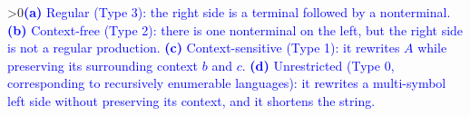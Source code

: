 \documentclass[12pt]{article}
\newcounter{showsolution}
\newcommand{\solution}[2]{\ifnum\value{showsolution}>0{\textcolor{blue}{#1}}\else{#2}\fi}
\begin{document}

\solution{\textbf{(a)} Regular (Type 3): the right side is a terminal followed by a nonterminal.
\textbf{(b)} Context-free (Type 2): there is one nonterminal on the left, but the right side is not a regular production.
\textbf{(c)} Context-sensitive (Type 1): it rewrites $A$ while preserving its surrounding context $b$ and $c$.
\textbf{(d)} Unrestricted (Type 0, corresponding to recursively enumerable languages): it rewrites a multi-symbol left side without preserving its context, and it shortens the string.}

\end{itemize}

\newpage 

\end{document}
